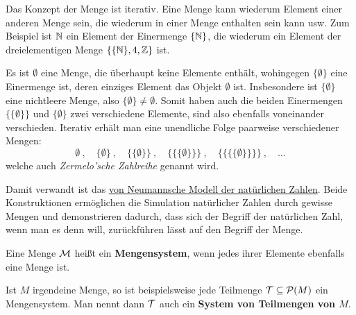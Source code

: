 \begin{vorschau}
    Das Konzept der Menge ist iterativ. Eine Menge kann wiederum Element einer anderen Menge sein, die wiederum in einer Menge enthalten sein kann usw. Zum Beispiel ist $\mathbb N$ ein Element der Einermenge $\{\mathbb N\}$, die wiederum ein Element der dreielementigen Menge $\{ \{\mathbb N \}, 4, \mathbb Z\}$ ist.

    Es ist $\emptyset$ eine Menge, die überhaupt keine Elemente enthält, wohingegen $\{\emptyset\}$ eine Einermenge ist, deren einziges Element das Objekt $\emptyset$ ist. Insbesondere ist $\{\emptyset\}$ eine nichtleere Menge, also $\{\emptyset\}\neq \emptyset$. Somit haben auch die beiden Einermengen $\{\{\emptyset\}\}$ und $\{\emptyset\}$ zwei verschiedene Elemente, sind also ebenfalls voneinander verschieden. Iterativ erhält man eine unendliche Folge paarweise verschiedener Mengen:
        \[ \emptyset \ ,\quad \{\emptyset\} \ ,\quad \{\{\emptyset\}\} \ ,\quad \{\{\{\emptyset\}\}\} \ , \quad \{\{\{\{\emptyset\}\}\}\} \ ,\quad \dots \]
    welche auch \emph{Zermelo'sche Zahlreihe} genannt wird.

    Damit verwandt ist das \href{https://de.wikipedia.org/wiki/Nat\%C3\%BCrliche_Zahl#Von_Neumanns_Modell_der_nat\%C3\%BCrlichen_Zahlen}{von Neumannsche Modell der natürlichen Zahlen}. Beide Konstruktionen ermöglichen die Simulation natürlicher Zahlen durch gewisse Mengen und demonstrieren dadurch, dass sich der Begriff der natürlichen Zahl, wenn man es denn will, zurückführen lässt auf den Begriff der Menge.
\end{vorschau}


\begin{defin}[Mengensystem]  
    Eine Menge $\mathcal M$ heißt ein \textbf{Mengensystem}, wenn jedes ihrer Elemente ebenfalls eine Menge ist.

    Ist $M$ irgendeine Menge, so ist beispielsweise jede Teilmenge $\mathcal T\subseteq \mathcal P(M)$ ein Mengensystem. Man nennt dann $\mathcal T$ auch ein \textbf{System von Teilmengen von $M$}.
\end{defin}


